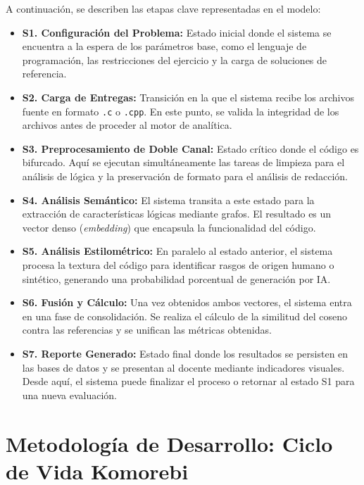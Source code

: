 A continuación, se describen las etapas clave representadas en el modelo:

\begin{itemize}
    \item \textbf{S1. Configuración del Problema:} Estado inicial donde el sistema se encuentra a la espera de los parámetros base, como el lenguaje de programación, las restricciones del ejercicio y la carga de soluciones de referencia.
    
    \item \textbf{S2. Carga de Entregas:} Transición en la que el sistema recibe los archivos fuente en formato \texttt{.c} o \texttt{.cpp}. En este punto, se valida la integridad de los archivos antes de proceder al motor de analítica.
    
    \item \textbf{S3. Preprocesamiento de Doble Canal:} Estado crítico donde el código es bifurcado. Aquí se ejecutan simultáneamente las tareas de limpieza para el análisis de lógica y la preservación de formato para el análisis de redacción.
    
    \item \textbf{S4. Análisis Semántico:} El sistema transita a este estado para la extracción de características lógicas mediante grafos. El resultado es un vector denso (\textit{embedding}) que encapsula la funcionalidad del código.
    
    \item \textbf{S5. Análisis Estilométrico:} En paralelo al estado anterior, el sistema procesa la textura del código para identificar rasgos de origen humano o sintético, generando una probabilidad porcentual de generación por IA.
    
    \item \textbf{S6. Fusión y Cálculo:} Una vez obtenidos ambos vectores, el sistema entra en una fase de consolidación. Se realiza el cálculo de la similitud del coseno contra las referencias y se unifican las métricas obtenidas.
    
    \item \textbf{S7. Reporte Generado:} Estado final donde los resultados se persisten en las bases de datos y se presentan al docente mediante indicadores visuales. Desde aquí, el sistema puede finalizar el proceso o retornar al estado S1 para una nueva evaluación.
\end{itemize}

\section{Metodología de Desarrollo: Ciclo de Vida Komorebi}
\label{sec:metodologia_komorebi}

